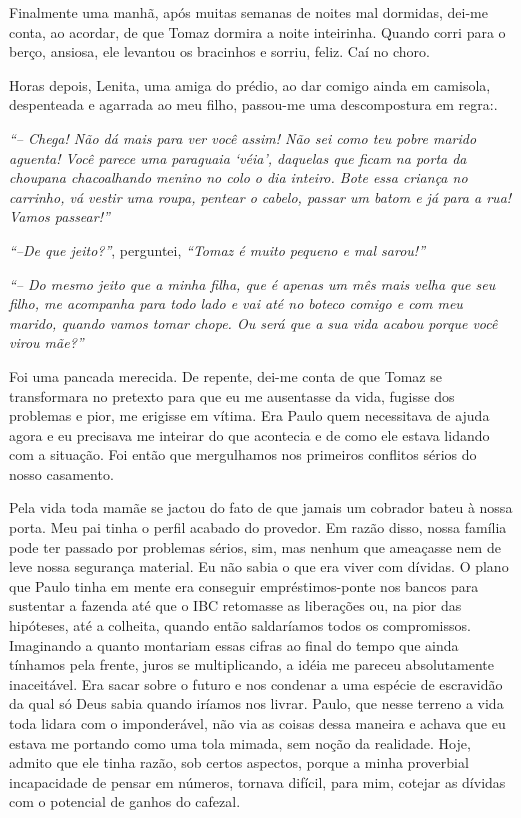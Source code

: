 Finalmente uma manhã, após muitas semanas de noites mal dormidas, dei-me conta, ao acordar, de que Tomaz dormira a noite inteirinha.
Quando corri para o berço, ansiosa, ele levantou os bracinhos e sorriu, feliz.
Caí no choro.

Horas depois, Lenita, uma amiga do prédio, ao dar comigo ainda em camisola, despenteada e agarrada ao meu filho, passou-me uma descompostura em regra:.

\textit{``-- Chega! Não dá mais para ver você assim! Não sei como teu pobre marido aguenta! Você parece uma paraguaia `véia', daquelas que ficam na porta da choupana chacoalhando menino no colo o dia inteiro.
Bote essa criança no carrinho, vá vestir uma roupa, pentear o cabelo, passar um batom e já para a rua! Vamos passear!''}

\textit{``--De que jeito?''}, perguntei, \textit{``Tomaz é muito pequeno e mal sarou!''}

\textit{``-- Do mesmo jeito que a minha filha, que é apenas um mês mais velha que seu filho, me acompanha para todo lado e vai até no boteco comigo e com meu marido, quando vamos tomar chope.
Ou será que a sua vida acabou porque você virou mãe?''}

Foi uma pancada merecida.
De repente, dei-me conta de que Tomaz se transformara no pretexto para que eu me ausentasse da vida, fugisse dos problemas e pior, me erigisse em vítima.
Era Paulo quem necessitava de ajuda agora e eu precisava me inteirar do que acontecia e de como ele estava lidando com a situação.
Foi então que mergulhamos nos primeiros conflitos sérios do nosso casamento.

Pela vida toda mamãe se jactou do fato de que jamais um cobrador bateu à nossa porta.
Meu pai tinha o perfil acabado do provedor.
Em razão disso, nossa família pode ter passado por problemas sérios, sim, mas nenhum que ameaçasse nem de leve nossa segurança material.
Eu não sabia o que era viver com dívidas.
O plano que Paulo tinha em mente era conseguir empréstimos-ponte nos bancos para sustentar a fazenda até que o IBC retomasse as liberações ou, na pior das hipóteses, até a colheita, quando então saldaríamos todos os compromissos.
Imaginando a quanto montariam essas cifras ao final do tempo que ainda tínhamos pela frente, juros se multiplicando, a idéia me pareceu absolutamente inaceitável.
Era sacar sobre o futuro e nos condenar a uma espécie de escravidão da qual só Deus sabia quando iríamos nos livrar.
Paulo, que nesse terreno a vida toda lidara com o imponderável, não via as coisas dessa maneira e achava que eu estava me portando como uma tola mimada, sem noção da realidade.
Hoje, admito que ele tinha razão, sob certos aspectos, porque a minha proverbial incapacidade de pensar em números, tornava difícil, para mim, cotejar as dívidas com o potencial de ganhos do cafezal.


